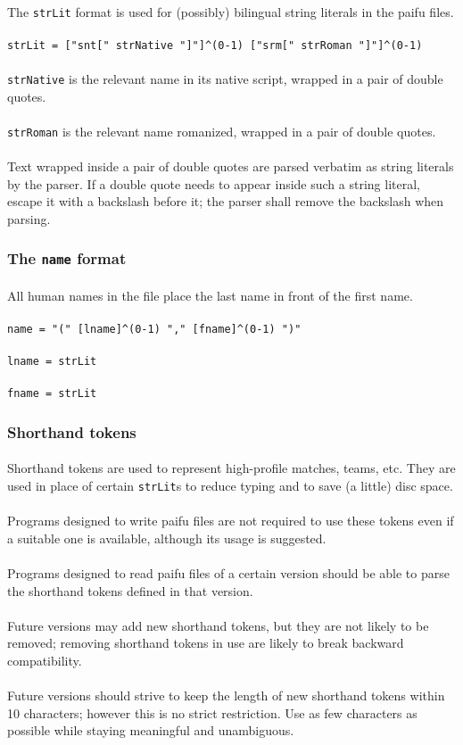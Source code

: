\documentclass[%
	a4paper%
	,10pt%
	,twoside%
	,notitlepage%
]{article}%
\newcommand*{\ruleSymbol}{\textjapanese{⚠}}%
\newcommand*{\ruleMargin}{\marginpar{\flushright{}\ruleSymbol{}}}%
\newcommand*{\rulePar}{\paragraph*{\ruleMargin{}}}%
\begin{document}
			\paragraph*{}The \lstinline/strLit/ format is used for (possibly) bilingual string literals in the paifu files. %
			\rulePar{}\lstinline/strLit = ["snt[" strNative "]"]^(0-1) ["srm[" strRoman "]"]^(0-1)/%
			\rulePar{}\lstinline/strNative/ is the relevant name in its native script, wrapped in a pair of double quotes. %
			\rulePar{}\lstinline/strRoman/ is the relevant name romanized, wrapped in a pair of double quotes. %
			\rulePar{}Text wrapped inside a pair of double quotes are parsed verbatim as string literals by the parser. If a double quote needs to appear inside such a string literal, escape it with a backslash before it; the parser shall remove the backslash when parsing. %
		\subsubsection{The \texttt{name} format}\label{subsubsec:name}%
			\paragraph*{}All human names in the file place the last name in front of the first name. %
			\rulePar{}\lstinline/name = "(" [lname]^(0-1) "," [fname]^(0-1) ")"/%
			\rulePar{}\lstinline/lname = strLit/%
			\rulePar{}\lstinline/fname = strLit/%
		\subsubsection{Shorthand tokens}\label{subsubsec:shtkn}%
			\paragraph*{}Shorthand tokens are used to represent high-profile matches, teams, etc. They are used in place of certain \lstinline/strLit/s to reduce typing and to save (a little) disc space. %
			\rulePar{}Programs designed to write paifu files are not required to use these tokens even if a suitable one is available, although its usage is suggested. %
			\rulePar{}Programs designed to read paifu files of a certain version should be able to parse the shorthand tokens defined in that version. %
			\rulePar{}Future versions may add new shorthand tokens, but they are not likely to be removed; removing shorthand tokens in use are likely to break backward compatibility. %
			\rulePar{}Future versions should strive to keep the length of new shorthand tokens within 10 characters; however this is no strict restriction. Use as few characters as possible while staying meaningful and unambiguous. %
\end{document}
